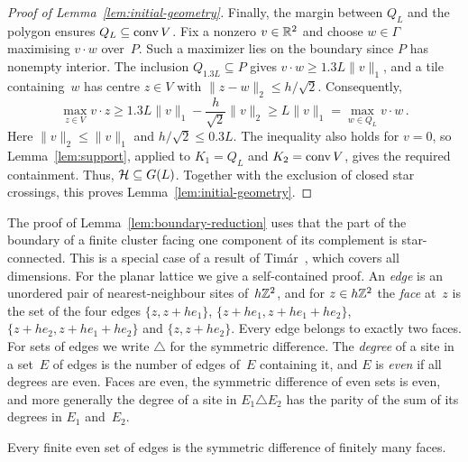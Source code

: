 \documentclass[11pt,letterpaper]{article}
\begin{document}
\begin{proof}[Proof of Lemma~\ref{lem:initial-geometry}]
Finally, the margin between $Q_L$ and the polygon ensures $Q_L\subseteq\operatorname{conv} V$. Fix a nonzero $v\in\mathbb R^2$ and choose $w\in\Gamma$ maximising $v\cdot w$ over~$P$. Such a maximizer lies on the boundary since $P$ has nonempty interior. The inclusion $Q_{1.3L}\subseteq P$ gives $v\cdot w\ge1.3L\lVert v\rVert_1$, and a tile containing~$w$ has centre $z\in V$ with $\lVert z-w\rVert_2\le h/\sqrt2$. Consequently,
\begin{equation}\label{eq:initial-convex-hull}
  \max_{z\in V}v\cdot z\ge1.3L\lVert v\rVert_1-\frac{h}{\sqrt2}\lVert v\rVert_2\ge L\lVert v\rVert_1=\max_{w\in Q_L}v\cdot w\,.
\end{equation}
Here $\lVert v\rVert_2\le\lVert v\rVert_1$ and $h/\sqrt2\le0.3L$. The inequality also holds for $v=0$, so Lemma~\ref{lem:support}, applied to $K_1=Q_L$ and $K_2=\operatorname{conv} V$, gives the required containment. Thus, $\mathcal H\subseteq G(L)$. Together with the exclusion of closed star crossings, this proves Lemma~\ref{lem:initial-geometry}.
\end{proof}

The proof of Lemma~\ref{lem:boundary-reduction} uses that the part of the boundary of a finite cluster facing one component of its complement is star-connected. This is a special case of a result of Tim\'ar~\cite[Lemma~2]{Tim13}, which covers all dimensions.
For the planar lattice we give a self-contained proof. An \emph{edge} is an unordered pair of nearest-neighbour sites of~$h\mathbb Z^2$, and for $z\in h\mathbb Z^2$ the \emph{face} at~$z$ is the set of the four edges $\{z,z+he_1\}$, $\{z+he_1,z+he_1+he_2\}$, $\{z+he_2,z+he_1+he_2\}$ and $\{z,z+he_2\}$. Every edge belongs to exactly two faces. For sets of edges we write $\triangle$ for the symmetric difference. The \emph{degree} of a site in a set~$E$ of edges is the number of edges of~$E$ containing it, and $E$ is \emph{even} if all degrees are even. Faces are even, the symmetric difference of even sets is even, and more generally the degree of a site in $E_1\triangle E_2$ has the parity of the sum of its degrees in $E_1$ and~$E_2$.

\begin{lemma}
\label{lem:faces}
Every finite even set of edges is the symmetric difference of finitely many faces.
\end{lemma}
\end{document}
